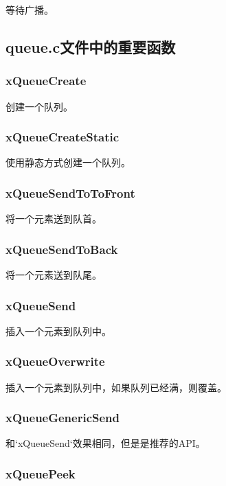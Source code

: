 \documentclass[12pt, a4paper]{article}
\begin{document}
等待广播。



\subsection {queue.c文件中的重要函数}

\subsubsection {xQueueCreate}

创建一个队列。

\subsubsection {xQueueCreateStatic}

使用静态方式创建一个队列。

\subsubsection {xQueueSendToToFront}

将一个元素送到队首。

\subsubsection {xQueueSendToBack}

将一个元素送到队尾。

\subsubsection {xQueueSend}

插入一个元素到队列中。

\subsubsection {xQueueOverwrite}

插入一个元素到队列中，如果队列已经满，则覆盖。

\subsubsection {xQueueGenericSend}

和`xQueueSend`效果相同，但是是推荐的API。

\subsubsection {xQueuePeek}
\end{document}
